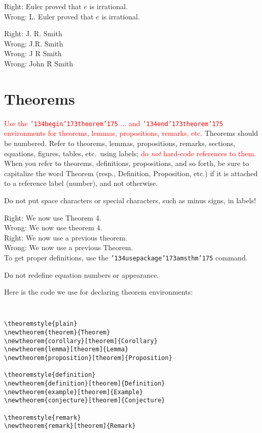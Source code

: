 \documentclass[12pt]{article}
\begin{document}
\medskip

\noindent Right:  Euler proved that $e$ is irrational. \\
\noindent Wrong:  L. Euler proved that $e$ is irrational.

\medskip

\noindent Right:  J. R. Smith \\
\noindent Wrong:  J.R. Smith \\
\noindent Wrong:  J R Smith \\
\noindent Wrong:  John R Smith

\section{Theorems}

\textcolor{red}{Use the {\tt \char'134begin\char'173theorem\char'175} $\ldots$
and {\tt \char'134end\char'173theorem\char'175} environments for theorems,
lemmas, propositions, remarks,
etc.}  Theorems should be numbered.  Refer to theorems,
lemmas, propositions, remarks, sections, equations, figures, tables, etc.\ using
labels; \textcolor{red}{do {\it not} hard-code references to them.}  When you
refer to theorems, definitions, propositions, and so forth, be sure
to capitalize the word Theorem (resp., Definition, Proposition, etc.) if
it is attached to a reference label (number), and not otherwise.

Do not put space characters or special characters, such as minus signs,
in labels!

\noindent  Right:  We now use Theorem 4.\\
\noindent Wrong:  We now use theorem 4.\\
\noindent Right:  We now use a previous theorem.\\
\noindent Wrong:  We now use a previous Theorem.\\

To get proper definitions, use the
{\tt \char'134usepackage\char'173amsthm\char'175} command.

Do not redefine equation numbers or appearance.  

Here is the code we use for declaring theorem environments:

{\tt
\begin{verbatim}
\theoremstyle{plain}
\newtheorem{theorem}{Theorem}
\newtheorem{corollary}[theorem]{Corollary}
\newtheorem{lemma}[theorem]{Lemma}
\newtheorem{proposition}[theorem]{Proposition}

\theoremstyle{definition}
\newtheorem{definition}[theorem]{Definition}
\newtheorem{example}[theorem]{Example}
\newtheorem{conjecture}[theorem]{Conjecture}

\theoremstyle{remark}
\newtheorem{remark}[theorem]{Remark}
\end{verbatim}
}
\end{document}
